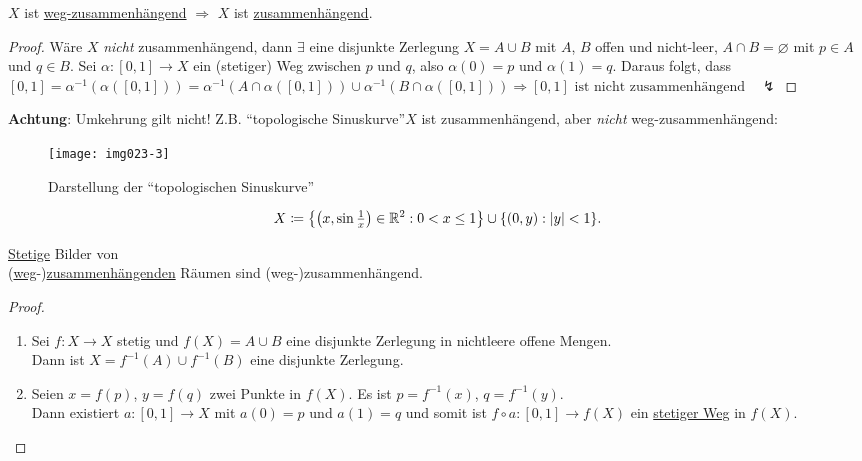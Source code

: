 \begin{lemma}
  $ X $ ist \hyperref[def:wegzusammenhaengend]{weg-zusammenhängend} $ \Rightarrow $ $ X $ ist \hyperref[def:zusammenhaengend]{zusammenhängend}.
  \begin{proof}
    Wäre $ X $ \emph{nicht} zusammenhängend, dann $ \exists $ eine disjunkte Zerlegung $ X = A \cup B $ mit $ A $, $ B $ offen und nicht-leer, $ A \cap B = \varnothing $ mit $ p \in A $ und $ q \in B $. Sei $ \alpha: [0,1] \to X $ ein (stetiger) Weg zwischen $ p $ und $ q $, also $ \alpha(0) = p $ und $ \alpha(1) = q $. Daraus folgt, dass $ [0,1] = \alpha^{-1}(\alpha([0,1])) = \alpha^{-1}(A \cap \alpha([0,1])) \cup \alpha^{-1}(B \cap \alpha([0,1])) \Rightarrow [0,1] \text{ ist nicht zusammenhängend} \quad \lightning $
  \end{proof}

  \begin{minipage}{.45\textwidth}
    \textbf{Achtung}: Umkehrung gilt nicht! Z.B. ``topologische Sinuskurve''\footnotemark $ X $ ist zusammenhängend, aber \emph{nicht} weg-zusammenhängend:
  \end{minipage}
  \hfill
  \begin{minipage}{.45\textwidth}
    \begin{figure}[H]
      \label{img023-3}
      \texttt{[image: img023-3]}
      \caption{Darstellung der ``topologischen Sinuskurve''}
    \end{figure}
  \end{minipage}
  \begin{equation*}
    X \coloneqq \left\{ \left( x, \sin\tfrac{1}{x} \right) \in \mathbb{R}^2 : 0 < x \leq 1 \right\} \cup \{ (0,y) : \vert y \vert < 1 \}\text{.}
  \end{equation*}
\end{lemma}

\begin{lemma}
  \hyperref[def:stetig]{Stetige} Bilder von \\ (\hyperref[def:wegzusammenhaengend]{weg}-)\hyperref[def:zusammenhaengend]{zusammenhängenden} Räumen sind (weg-)zusammenhängend.
  \begin{proof}
    \
    \begin{enumerate}
      \item Sei $ f: X \to X $ stetig und $ f(X) = A \cup B $ eine disjunkte Zerlegung in nichtleere offene Mengen. \\
        Dann ist $ X = f^{-1}(A) \cup f^{-1}(B) $ eine disjunkte Zerlegung.
      \item Seien $ x = f(p) $, $ y = f(q) $ zwei Punkte in $ f(X) $. Es ist $ p = f^{-1}(x) $, $ q = f^{-1}(y) $. \\
        Dann existiert $ a: [0,1] \to X $ mit $ a(0) = p $ und $ a(1) = q $ und somit ist $ f \circ a: [0,1] \to f(X) $ ein \hyperref[def:wegzusammenhaengend]{stetiger Weg} in $ f(X) $. 
    \end{enumerate}
  \end{proof}
\end{lemma}

